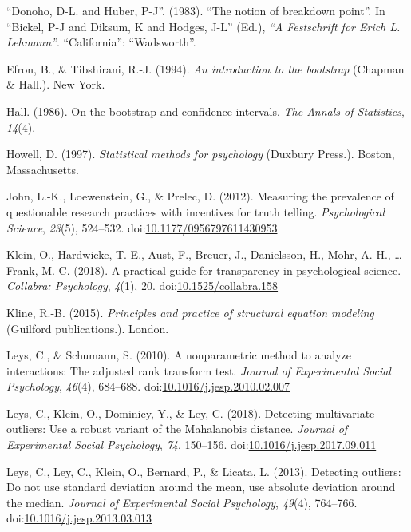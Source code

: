 \documentclass[man,floatsintext]{apa6}
\begin{document}
\hypertarget{ref-Donoho_and_Huber_1983}{}
``Donoho, D-L. and Huber, P-J''. (1983). ``The notion of breakdown
point''. In ``Bickel, P-J and Diksum, K and Hodges, J-L'' (Ed.),
\emph{``A Festschrift for Erich L. Lehmann''}. ``California'':
``Wadsworth''.

\hypertarget{ref-Efron_Tibshirani_1994}{}
Efron, B., \& Tibshirani, R.-J. (1994). \emph{An introduction to the
bootstrap} (Chapman \& Hall.). New York.

\hypertarget{ref-Hall_1986}{}
Hall. (1986). On the bootstrap and confidence intervals. \emph{The
Annals of Statistics}, \emph{14}(4).

\hypertarget{ref-Howell_1997}{}
Howell, D. (1997). \emph{Statistical methods for psychology} (Duxbury
Press.). Boston, Massachusetts.

\hypertarget{ref-John_et_al_2012}{}
John, L.-K., Loewenstein, G., \& Prelec, D. (2012). Measuring the
prevalence of questionable research practices with incentives for truth
telling. \emph{Psychological Science}, \emph{23}(5), 524--532.
doi:\href{https://doi.org/10.1177/0956797611430953}{10.1177/0956797611430953}

\hypertarget{ref-Klein_et_al_2018}{}
Klein, O., Hardwicke, T.-E., Aust, F., Breuer, J., Danielsson, H., Mohr,
A.-H., \ldots{} Frank, M.-C. (2018). A practical guide for transparency
in psychological science. \emph{Collabra: Psychology}, \emph{4}(1), 20.
doi:\href{https://doi.org/10.1525/collabra.158}{10.1525/collabra.158}

\hypertarget{ref-Kline_2015}{}
Kline, R.-B. (2015). \emph{Principles and practice of structural
equation modeling} (Guilford publications.). London.

\hypertarget{ref-Leys_and_Schumann_2010}{}
Leys, C., \& Schumann, S. (2010). A nonparametric method to analyze
interactions: The adjusted rank transform test. \emph{Journal of
Experimental Social Psychology}, \emph{46}(4), 684--688.
doi:\href{https://doi.org/10.1016/j.jesp.2010.02.007}{10.1016/j.jesp.2010.02.007}

\hypertarget{ref-Leys_et_al_2018}{}
Leys, C., Klein, O., Dominicy, Y., \& Ley, C. (2018). Detecting
multivariate outliers: Use a robust variant of the Mahalanobis distance.
\emph{Journal of Experimental Social Psychology}, \emph{74}, 150--156.
doi:\href{https://doi.org/10.1016/j.jesp.2017.09.011}{10.1016/j.jesp.2017.09.011}

\hypertarget{ref-Leys_et_al_2013}{}
Leys, C., Ley, C., Klein, O., Bernard, P., \& Licata, L. (2013).
Detecting outliers: Do not use standard deviation around the mean, use
absolute deviation around the median. \emph{Journal of Experimental
Social Psychology}, \emph{49}(4), 764--766.
doi:\href{https://doi.org/10.1016/j.jesp.2013.03.013}{10.1016/j.jesp.2013.03.013}
\end{document}
